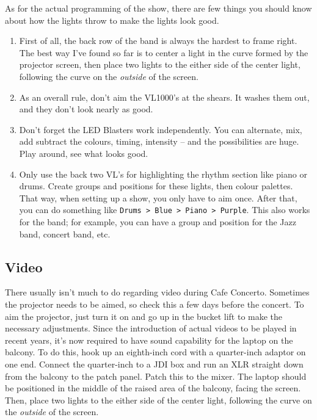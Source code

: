 \documentclass[letterpaper,10pt,oneside,headsepline]{scrreprt}
\begin{document}
As for the actual programming of the show, there are few things you should know about how the lights throw to make the lights look good. 

\begin{enumerate}
\item First of all, the back row of the band is always the hardest to frame right. The best way I've found so far is to center a light in the curve formed by the projector screen, then place two lights to the either side of the center light, following the curve on the \textit{outside} of the screen.
\item As an overall rule, don't aim the VL1000's at the shears. It washes them out, and they don't look nearly as good.
\item Don't forget the LED Blasters work independently. You can alternate, mix, add subtract the colours, timing, intensity -- and the possibilities are huge. Play around, see what looks good. 
\item Only use the back two VL's for highlighting the rhythm section like piano or drums. Create groups and positions for these lights, then colour palettes. That way, when setting up a show, you only have to aim once. After that, you can do something like \texttt{Drums > Blue > Piano > Purple}. This also works for the band; for example, you can have a group and position for the Jazz band, concert band, etc.
\end{enumerate}

\subsection{Video}
There usually isn't much to do regarding video during Cafe Concerto. Sometimes the projector needs to be aimed, so check this a few days before the concert. To aim the projector, just turn it on and go up in the bucket lift to make the necessary adjustments. Since the introduction of actual videos to be played in recent years, it's now required to have sound capability for the laptop on the balcony. To do this, hook up an eighth-inch cord with a quarter-inch adaptor on one end. Connect the quarter-inch to a JDI box and run an XLR straight down from the balcony to the patch panel. Patch this to the mixer. The laptop should be positioned in the middle of the raised area of the balcony, facing the screen. Then, place two lights to the either side of the center light, following the curve on the \textit{outside} of the screen.

\end{document}
